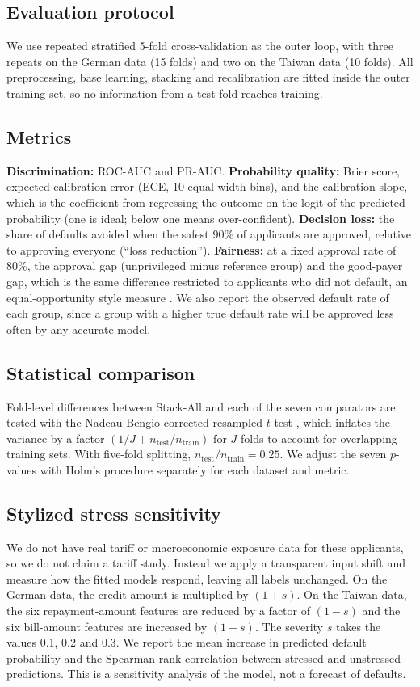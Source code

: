 \documentclass[conference,a4paper]{IEEEtran}
\begin{document}
\subsection{Evaluation protocol}
We use repeated stratified 5-fold cross-validation as the outer loop, with three repeats on the German data (15 folds) and two on the Taiwan data (10 folds). All preprocessing, base learning, stacking and recalibration are fitted inside the outer training set, so no information from a test fold reaches training.

\subsection{Metrics}
\textbf{Discrimination:} ROC-AUC and PR-AUC. \textbf{Probability quality:} Brier score, expected calibration error (ECE, 10 equal-width bins), and the calibration slope, which is the coefficient from regressing the outcome on the logit of the predicted probability (one is ideal; below one means over-confident). \textbf{Decision loss:} the share of defaults avoided when the safest 90\% of applicants are approved, relative to approving everyone (``loss reduction''). \textbf{Fairness:} at a fixed approval rate of 80\%, the approval gap (unprivileged minus reference group) and the good-payer gap, which is the same difference restricted to applicants who did not default, an equal-opportunity style measure \cite{hardt}. We also report the observed default rate of each group, since a group with a higher true default rate will be approved less often by any accurate model.

\subsection{Statistical comparison}
Fold-level differences between Stack-All and each of the seven comparators are tested with the Nadeau-Bengio corrected resampled $t$-test \cite{r25}, which inflates the variance by a factor $(1/J + n_{\mathrm{test}}/n_{\mathrm{train}})$ for $J$ folds to account for overlapping training sets. With five-fold splitting, $n_{\mathrm{test}}/n_{\mathrm{train}}=0.25$. We adjust the seven $p$-values with Holm's procedure \cite{holm} separately for each dataset and metric.

\subsection{Stylized stress sensitivity}
We do not have real tariff or macroeconomic exposure data for these applicants, so we do not claim a tariff study. Instead we apply a transparent input shift and measure how the fitted models respond, leaving all labels unchanged. On the German data, the credit amount is multiplied by $(1+s)$. On the Taiwan data, the six repayment-amount features are reduced by a factor of $(1-s)$ and the six bill-amount features are increased by $(1+s)$. The severity $s$ takes the values 0.1, 0.2 and 0.3. We report the mean increase in predicted default probability and the Spearman rank correlation between stressed and unstressed predictions. This is a sensitivity analysis of the model, not a forecast of defaults.
\end{document}

